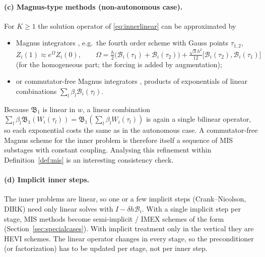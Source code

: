 \documentclass[11pt,a4paper]{article}
\theoremstyle{definition}
\theoremstyle{remark}
\begin{document}
\paragraph{(c) Magnus-type methods (non-autonomous case).}
For $K\ge1$ the solution operator of \eqref{eq:innerlinear} can be
approximated by
\begin{itemize}
\item Magnus integrators \cite{BlanesCasasOteoRos2009}, e.g.\ the fourth
  order scheme with Gauss points $\tau_{1,2}$,
  \begin{equation*}
  Z_i(1)\approx e^{\Omega}Z_i(0),\qquad
  \Omega=\tfrac h2\big(\mathcal B_i(\tau_1)+\mathcal B_i(\tau_2)\big)+\tfrac{\sqrt3h^2}{12}\big[\mathcal B_i(\tau_2),\mathcal B_i(\tau_1)\big]
  \end{equation*}
  (for the homogeneous part; the forcing is added by augmentation);
\item or commutator-free Magnus integrators
  \cite{BlanesMoan2006,AlvermannFehske2011}, products of exponentials of
  linear combinations $\sum_l\beta_l\mathcal B_i(\tau_l)$.
\end{itemize}
Because $\mathfrak B_1$ is linear in $w$, a linear combination
$\sum_l\beta_l\mathfrak B_1(W_i(\tau_l))=\mathfrak B_1(\sum_l\beta_lW_i(\tau_l))$
is again a single bilinear operator, so each exponential costs the same
as in the autonomous case. A commutator-free Magnus scheme for the inner
problem is therefore itself a sequence of MIS substages with constant
coupling. Analysing this refinement within Definition~\ref{def:mis} is
an interesting consistency check.

\paragraph{(d) Implicit inner steps.}
The inner problems are linear, so one or a few implicit steps
(Crank--Nicolson, DIRK) need only linear solves with
$I-\delta h\mathcal B_i$. With a single implicit step per stage, MIS
methods become semi-implicit / IMEX schemes of the form
\cite{BoscarinoFilbetRusso2016} (Section~\ref{sec:specialcases}). With
implicit treatment only in the vertical they are HEVI schemes. The
linear operator changes in every stage, so the preconditioner (or
factorization) has to be updated per stage, not per inner step.
\end{document}
